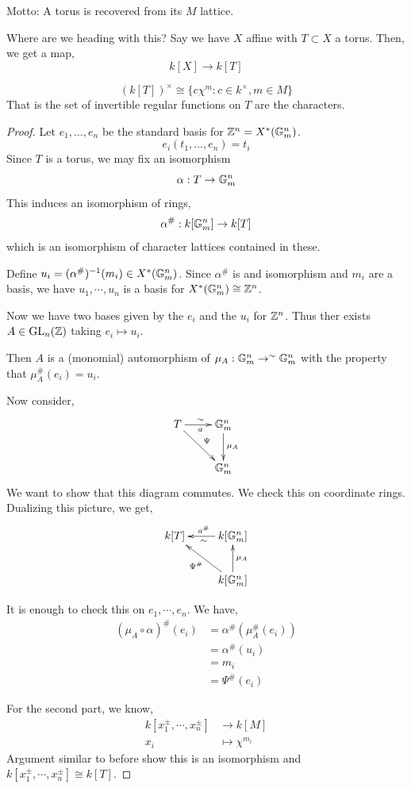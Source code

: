 \documentclass[12pt]{amsart}
\begin{document}
Motto: A torus is recovered from its $M$ lattice. 

Where are we heading with this? Say we have $X$ affine with $T \subset X$ a torus. Then, we get a map, 
\[ k[X] \to k[T] \]
\begin{corollary}
    \[ (k[T])^\times \cong \{ c\chi^m : c \in k^\times, m \in M\}\]
    That is the set of invertible regular functions on $T$ are the characters. 
\end{corollary}

\begin{proof}
    Let $e_1, \ldots, e_n$ be the standard basis for $\mathbb Z^n = X^*(\mathbb G_m^n)$. 
    \[ e_i(t_1, \ldots, e_n) = t_i\]
    Since $T$ is a torus, we may fix an isomorphism 
    \[ \alpha: T \to \mathbb G_m^n\]
    This induces an isomorphism of rings, 
    \[ \alpha^\#: k[\mathbb G_m^n] \to k[T]\]
    which is an isomorphism of character lattices contained in these. 
    
    Define $u_i = (\alpha^\#)^{-1}(m_i) \in X^*(\mathbb G_m^n)$. Since $\alpha^\#$ is and isomorphism and $m_i$ are a basis, we have $u_1, \cdots, u_n$ is a basis for $X^*(\mathbb G_m^n) \cong \mathbb Z^n$. 

    Now we have two bases given by the $e_i$ and the $u_i$ for $\mathbb Z^n$. Thus ther exists $A \in \operatorname{GL}_n(\mathbb Z)$ taking $e_i \mapsto u_i$. 

    Then $A$ is a (monomial) automorphism of $\mu_A: \mathbb G_m^n \to^\sim \mathbb G_m^n$ with the property that $\mu^\#_A(e_i) = u_i$. 

    Now consider,
    \[ \xymatrix{ T \ar[r]^\sim_a \ar[rd]^\Psi & \G_m^n \ar[d]^{\mu_A} \\ 
    & \G_m^n }\]
    We want to show that this diagram commutes. We check this on coordinate rings. Dualizing this picture, we get, 
    \[ \xymatrix{ k[T] & k[\G_m^n] \ar[l]^\sim_{a^\#}  \\ 
    & k[\G_m^n] \ar[u]_{\mu_A} \ar[ul]^{\Psi^\#}  }\]

    It is enough to check this on $e_1, \cdots, e_n$. We have, 
    \begin{align*}
        (\mu_A \circ \alpha)^\#(e_i) &= \alpha^\#(\mu^\#_A(e_i)) \\ 
        &= \alpha^\#(u_i) \\
        &= m_i \\
        &= \Psi^\#(e_i)
    \end{align*}

    For the second part, we know, 
    \begin{align*}
        k[x_1^\pm, \cdots, x_n^\pm]  &\to k[M] \\
        x_i &\mapsto \chi^{m_i}
    \end{align*}
    Argument similar to before show this is an isomorphism and $k[x_1^\pm, \cdots, x_n^\pm] \cong k[T]$. 
\end{proof}
\end{document}
